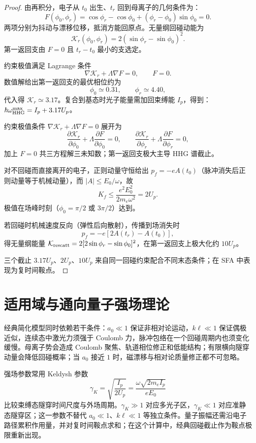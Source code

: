 \begin{proof}
由再积分，电子从 $t_0$ 出生、$t_r$ 回到母离子的几何条件为：
\[
F(\phi_0,\phi_r)
=\cos\phi_r-\cos\phi_0+(\phi_r-\phi_0)\sin\phi_0=0.
\]
两项分别为抖动与漂移位移，抵消方能回原点。无量纲回碰动能为
\[
\mathcal K_r(\phi_0,\phi_r)
=2(\sin\phi_r-\sin\phi_0)^2.
\]
第一返回支由 $F=0$ 且 $t_r-t_0$ 最小的支选定。

约束极值满足 Lagrange 条件
\[
\nabla\mathcal K_r+\Lambda\nabla F=0,
\qquad F=0.
\]
数值解给出第一返回支的最优相位约为
\[
\phi_0\simeq0.31,
\qquad
\phi_r\simeq4.40,
\]
代入得 $\mathcal K_r\simeq3.17$。复合到基态时光子能量需加回束缚能 $I_p$，得到：$\hbar\omega_{\rm HHG}^{\max}=I_p+3.17U_p$。

约束极值条件 $\nabla\mathcal K_r+\Lambda\nabla F=0$ 展开为
\begin{equation*}
 \frac{\partial\mathcal K_r}{\partial\phi_0}+\Lambda\frac{\partial F}{\partial\phi_0}=0,
 \qquad
 \frac{\partial\mathcal K_r}{\partial\phi_r}+\Lambda\frac{\partial F}{\partial\phi_r}=0,
\end{equation*}
加上 $F=0$ 共三方程解三未知数；第一返回支极大主导 HHG 谱截止。

对不回碰而直接离开的电子，正则动量守恒给出 $p_f=-eA(t_0)$（脉冲消失后正则动量等于机械动量），而 $|A|\le E_0/\omega$，故
\[
K_f\le\frac{e^2E_0^2}{2m_e\omega^2}=2U_p.
\]
极值在场峰时刻（$\phi_0=\pi/2$ 或 $3\pi/2$）达到。

若回碰时机械速度反向（弹性后向散射），传播到场消失时
\[
p_f=-e[2A(t_r)-A(t_0)],
\]
得无量纲能量 $\mathcal K_{\rm rescatt}=2[2\sin\phi_r-\sin\phi_0]^2$，在第一返回支上极大化约 $10U_p$。

三个截止 $3.17U_p$、$2U_p$、$10U_p$ 来自同一回碰约束配合不同末态条件；在 SFA 中表现为复时间鞍点。
\end{proof}

\section{适用域与通向量子强场理论}

经典简化模型同时依赖若干条件：$a_0\ll1$ 保证非相对论运动，$k\ell\ll1$ 保证偶极近似，连续态中激光力须强于 Coulomb 力，脉冲包络在一个回碰周期内也须变化缓慢。母离子势会造成 Coulomb 聚焦、轨道相位修正和低能结构；有限横向隧穿动量会降低回碰概率；当 $a_0$ 接近 $1$ 时，磁漂移与相对论质量修正都不可忽略。

强场参数常用 Keldysh 参数
\begin{equation}
\gamma_K=\sqrt{\frac{I_p}{2U_p}}
=\frac{\omega\sqrt{2m_eI_p}}{eE_0}
\label{eq:keldysh-parameter-classical}
\end{equation}
比较束缚态隧穿时间尺度与外场周期。$\gamma_K\gg1$ 对应多光子区，$\gamma_K\ll1$ 对应准静态隧穿区；这一参数不替代 $a_0\ll1$、$k\ell\ll1$ 等独立条件。量子振幅还需沿电子路径累积作用量，并对复时间鞍点求和；在这个计算中，经典回碰截止作为鞍点极限重新出现。

